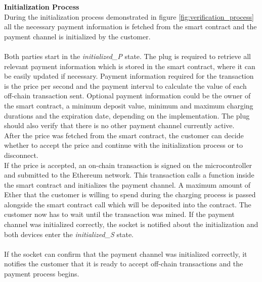 \textbf{Initialization Process}\\
During the initialization process demonstrated in figure \ref{fig:verification_process} all the necessary payment information is fetched from the smart contract and the payment channel is initialized by the customer.
\\\\
Both parties start in the \textit{initialized\_P} state.
The plug is required to retrieve all relevant payment information which is stored in the smart contract, where it can be easily updated if necessary.
Payment information required for the transaction is the price per second and the payment interval to calculate the value of each off-chain transaction sent.
Optional payment information could be the owner of the smart contract, a minimum deposit value, minimum and maximum charging durations and the expiration date, depending on the implementation.
The plug should also verify that there is no other payment channel currently active.
\\
After the price was fetched from the smart contract, the customer can decide whether to accept the price and continue with the initialization process or to disconnect.
\\
If the price is accepted, an on-chain transaction is signed on the microcontroller and submitted to the Ethereum network.
This transaction calls a function inside the smart contract and initializes the payment channel.
A maximum amount of Ether that the customer is willing to spend during the charging process is passed alongside the smart contract call which will be deposited into the contract.
The customer now has to wait until the transaction was mined.
If the payment channel was initialized correctly, the socket is notified about the initialization and both devices enter the \textit{initialized\_S} state.
\\\\
If the socket can confirm that the payment channel was initialized correctly, it notifies the customer that it is ready to accept off-chain transactions and the payment process begins.
